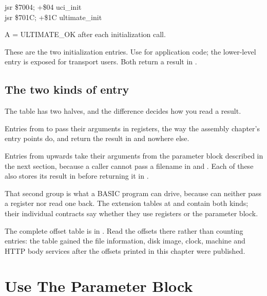 \begin{listingbox}
\hspace*{2em}jsr \$7004\hspace{2em}; +\$04  uci\_init\\
\hspace*{2em}jsr \$701C\hspace{2em}; +\$1C  ultimate\_init
\end{listingbox}

\begin{resultbox}
A = ULTIMATE_OK after each initialization call.
\end{resultbox}

These are the two initialization entries. Use  for
application code; the lower-level  entry is exposed for
transport users. Both return a result in .

\subsection*{The two kinds of entry}

The table has two halves, and the difference decides how you read a result.

Entries from  to  pass their arguments in registers, the
way the assembly chapter's entry points do, and return the result in 
and nowhere else.

Entries from  upwards take their arguments from the parameter block
described in the next section, because a caller cannot pass a filename in
 and . Each of these also stores its result in 
before returning it in .

That second group is what a BASIC program can drive, because  can
neither pass a register nor read one back. The extension tables at
 and  contain both kinds; their individual contracts
say whether they use registers or the parameter block.

The complete offset table is in . Read the
offsets there rather than counting entries: the table gained the file
information, disk image, clock, machine and HTTP body services after the
offsets printed in this chapter were published.


\section{Use The Parameter Block}

